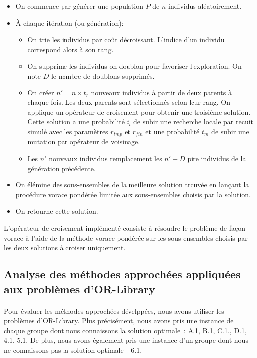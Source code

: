 \documentclass[12pt,letterpaper,twoside]{article}
\begin{document}
					\begin{itemize}
						\item On commence par générer une population \(P\) de \(n\) individus aléatoirement.
						\item À chaque itération (ou génération):
							\begin{itemize}
								\item On trie les individus par coût décroissant. L'indice d'un individu correspond alors à son rang.
								\item On supprime les individus on doublon pour favoriser l'exploration. On note \(D\) le nombre de doublons supprimés.
								\item On créer \(n' = n \times t_r\) nouveaux individus à partir de deux parents à chaque fois.
									Les deux parents sont sélectionnés selon leur rang. On applique un opérateur de croisement
									pour obtenir une troisième solution. Cette solution a une probabilité \(t_l\) de subir une
									recherche locale par recuit simulé avec les paramètres \(r_{tmp}\) et \(r_{fin}\) et une probabilité
									\(t_m\) de subir une mutation par opérateur de voisinage.
								\item Les \(n'\) nouveaux individus remplacement les \(n' - D\) pire individus de la génération précédente.
							\end{itemize}
						\item On élémine des sous-ensembles de la meilleure solution trouvée en lançant la procédure vorace pondérée limitée
							aux sous-ensembles choisis par la solution.
						\item On retourne cette solution.
					\end{itemize}

					L'opérateur de croisement implémenté consiste à résoudre le problème de façon vorace à l'aide de la méthode vorace pondérée
					sur les sous-ensembles choisis par les deux solutions à croiser uniquement.

		\subsection{Analyse des méthodes approchées appliquées aux problèmes d'OR-Library}
			\paragraph*{}
				Pour évaluer les méthodes approchées dévelppées, nous avons utiliser les problèmes d'OR-Library.
				Plus précisément, nous avons pris une instance de chaque groupe dont nous connaissons la solution optimale~: A.1, B.1, C.1., D.1, 4.1, 5.1.
				De plus, nous avons également pris une instance d'un groupe dont nous ne connaissons pas la solution optimale~: 6.1.
\end{document}
